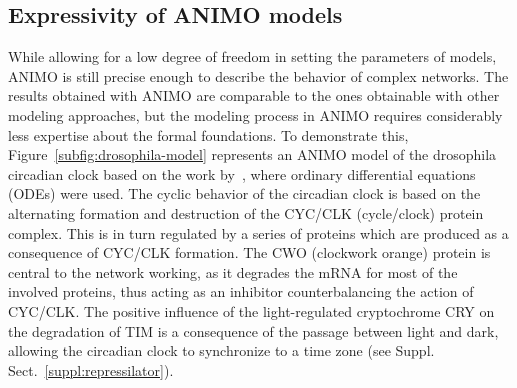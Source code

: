 \subsection{Expressivity of ANIMO models}\label{sec:animo-drosophila}
While allowing for a low degree of freedom in setting the parameters of models,
ANIMO is still precise enough to describe the behavior of complex networks.
The results obtained with ANIMO are comparable to the ones obtainable with other modeling
approaches, but the modeling process in ANIMO requires considerably less expertise about the formal foundations.
To demonstrate this, Figure~\ref{subfig:drosophila-model}
represents an ANIMO model of the drosophila circadian clock based on the work by~\cite{drosophila-ode-model}, where ordinary
differential equations (ODEs) were used.
The cyclic behavior of the circadian clock is based on the alternating formation and destruction of the CYC/CLK (cycle/clock) protein complex.
This is in turn regulated by a series of proteins which are produced as a consequence of CYC/CLK formation. The CWO (clockwork orange) protein
is central to the network working, as it degrades the mRNA for most of the involved proteins, thus acting as an inhibitor counterbalancing
the action of CYC/CLK.
The positive influence of the light-regulated cryptochrome CRY on the degradation of TIM is a consequence of the passage between light and dark, allowing
the circadian clock to synchronize to a time zone (see Suppl. Sect.~\ref{suppl:repressilator}).


\def\drosophilaGraphScale{0.069}%

